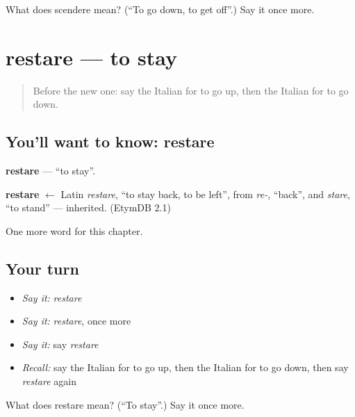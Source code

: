 \begin{tcolorbox}[breakable,colback=teal!4,colframe=teal!35!black,title={Before you move on}]
What does scendere mean? (\textquotedblleft{}To go down, to get off\textquotedblright{}.) Say it once more.
\end{tcolorbox}
\section[restare]{restare — to stay}

\label{lesson:IT-C135-restare}



\begin{quote}
Before the new one: say the Italian for to go up, then the Italian for to go down.
\end{quote}

\subsection*{You'll want to know: restare}
\textbf{restare} — \textquotedblleft{}to stay\textquotedblright{}.

\begin{cousinweb}
\textbf{restare} $\leftarrow$ Latin \emph{restare}, \textquotedblleft{}to stay back, to be left\textquotedblright{}, from \emph{re-}, \textquotedblleft{}back\textquotedblright{}, and \emph{stare}, \textquotedblleft{}to stand\textquotedblright{} — inherited. (EtymDB 2.1)
\end{cousinweb}

\begin{grammarlens}[title={What you've built}]
One more word for this chapter.
\end{grammarlens}

\subsection*{Your turn}
\begin{itemize}
\raggedright
  \item \emph{Say it:} \emph{restare}
  \item \emph{Say it:} \emph{restare}, once more
  \item \emph{Say it:} say \emph{restare}
  \item \emph{Recall:} say the Italian for to go up, then the Italian for to go down, then say \emph{restare} again
\end{itemize}

\begin{tcolorbox}[breakable,colback=teal!4,colframe=teal!35!black,title={Before you move on}]
What does restare mean? (\textquotedblleft{}To stay\textquotedblright{}.) Say it once more.
\end{tcolorbox}
